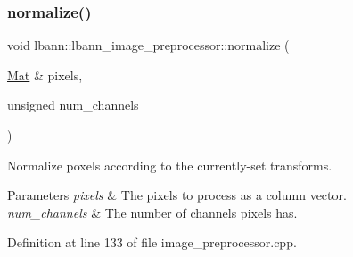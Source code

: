 \subsubsection{\texorpdfstring{normalize()}{normalize()}}
{\footnotesize\ttfamily void lbann\+::lbann\+\_\+image\+\_\+preprocessor\+::normalize (\begin{DoxyParamCaption}\item[{\hyperlink{base_8hpp_a68f11fdc31b62516cb310831bbe54d73}{Mat} \&}]{pixels,  }\item[{unsigned}]{num\+\_\+channels }\end{DoxyParamCaption})}

Normalize poxels according to the currently-\/set transforms. 
\begin{DoxyParams}{Parameters}
{\em pixels} & The pixels to process as a column vector. \\
\hline
{\em num\+\_\+channels} & The number of channels pixels has. \\
\hline
\end{DoxyParams}


Definition at line 133 of file image\+\_\+preprocessor.\+cpp.


